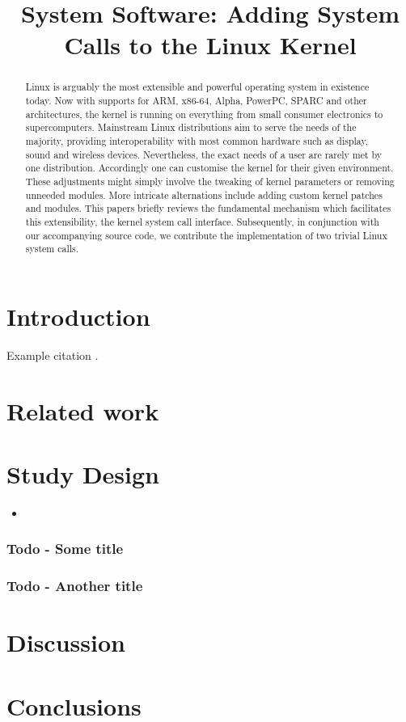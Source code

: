 \documentclass{article}
\title{System Software: Adding System Calls to the Linux Kernel}
\begin{document}
\maketitle

\begin{abstract}
Linux is arguably the most extensible and powerful operating system in existence today. 
Now with supports for ARM, x86-64, Alpha, PowerPC, SPARC and other architectures, 
the kernel is running on everything from small consumer electronics to supercomputers.
Mainstream Linux distributions aim to serve the needs of the majority, providing
interoperability with most common hardware such as display, sound and wireless devices.
Nevertheless, the exact needs of a user are rarely met by one distribution.
Accordingly one can customise the kernel for their given environment.
These adjustments might simply involve the tweaking of kernel parameters or removing
unneeded modules. More intricate alternations include adding custom 
kernel patches and modules. 
This papers briefly reviews the 
fundamental mechanism which facilitates this
extensibility, the kernel system call interface. Subsequently, in conjunction 
with our accompanying source code, we contribute the implementation of two trivial Linux system
calls.





\end{abstract}

\section{Introduction}
Example citation \citep{db}. \lipsum[1]


\section{Related work}
\lipsum[1]

\section{Study Design}
\lipsum[1]
\begin{itemize}
\item \lipsum[1]
\end{itemize}

\subsubsection{Todo - Some title}
\lipsum[1]

\subsubsection{Todo - Another title}
\lipsum[1]


\section{Discussion}
\lipsum[1]

\section{Conclusions}
\lipsum[1]


\vspace{-7.5mm}
\renewcommand{\refname}{\section{References}}

\end{document}
